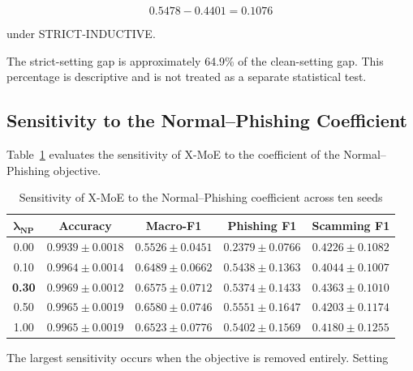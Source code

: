 \documentclass{ieeeaccess}
\begin{document}
\begin{equation}
0.5478-0.4401=0.1076
\end{equation}

under STRICT-INDUCTIVE.

The strict-setting gap is approximately 64.9\% of the clean-setting gap. This percentage is descriptive and is not treated as a separate statistical test.


\subsection{Sensitivity to the Normal--Phishing Coefficient}

Table~\ref{tab:lambda_sensitivity_results} evaluates the sensitivity of X-MoE to the coefficient of the Normal--Phishing objective.

\begin{table}[t]
\centering
\caption{Sensitivity of X-MoE to the Normal--Phishing coefficient across ten seeds}
\label{tab:lambda_sensitivity_results}

\renewcommand{\arraystretch}{1.12}
\setlength{\tabcolsep}{5pt}
\scriptsize

\begin{tabular}{ccccc}
\toprule
\(\boldsymbol{\lambda_{NP}}\) &
\textbf{Accuracy} &
\textbf{Macro-F1} &
\textbf{Phishing F1} &
\textbf{Scamming F1} \\
\midrule

0.00 &
$0.9939 \pm 0.0018$ &
$0.5526 \pm 0.0451$ &
$0.2379 \pm 0.0766$ &
$0.4226 \pm 0.1082$ \\

0.10 &
$0.9964 \pm 0.0014$ &
$0.6489 \pm 0.0662$ &
$0.5438 \pm 0.1363$ &
$0.4044 \pm 0.1007$ \\

\textbf{0.30} &
$\mathbf{0.9969 \pm 0.0012}$ &
$0.6575 \pm 0.0712$ &
$0.5374 \pm 0.1433$ &
$\mathbf{0.4363 \pm 0.1010}$ \\

0.50 &
$0.9965 \pm 0.0019$ &
$\mathbf{0.6580 \pm 0.0746}$ &
$\mathbf{0.5551 \pm 0.1647}$ &
$0.4203 \pm 0.1174$ \\

1.00 &
$0.9965 \pm 0.0019$ &
$0.6523 \pm 0.0776$ &
$0.5402 \pm 0.1569$ &
$0.4180 \pm 0.1255$ \\

\bottomrule
\end{tabular}
\end{table}

The largest sensitivity occurs when the objective is removed entirely. Setting
\end{document}
